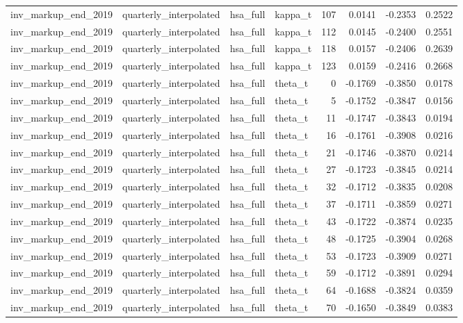 \begin{tabular}{llllrrrr}
inv\_markup\_end\_2019 & quarterly\_interpolated & hsa\_full & kappa\_t & 107 & 0.0141 & -0.2353 & 0.2522 \\
inv\_markup\_end\_2019 & quarterly\_interpolated & hsa\_full & kappa\_t & 112 & 0.0145 & -0.2400 & 0.2551 \\
inv\_markup\_end\_2019 & quarterly\_interpolated & hsa\_full & kappa\_t & 118 & 0.0157 & -0.2406 & 0.2639 \\
inv\_markup\_end\_2019 & quarterly\_interpolated & hsa\_full & kappa\_t & 123 & 0.0159 & -0.2416 & 0.2668 \\
inv\_markup\_end\_2019 & quarterly\_interpolated & hsa\_full & theta\_t & 0 & -0.1769 & -0.3850 & 0.0178 \\
inv\_markup\_end\_2019 & quarterly\_interpolated & hsa\_full & theta\_t & 5 & -0.1752 & -0.3847 & 0.0156 \\
inv\_markup\_end\_2019 & quarterly\_interpolated & hsa\_full & theta\_t & 11 & -0.1747 & -0.3843 & 0.0194 \\
inv\_markup\_end\_2019 & quarterly\_interpolated & hsa\_full & theta\_t & 16 & -0.1761 & -0.3908 & 0.0216 \\
inv\_markup\_end\_2019 & quarterly\_interpolated & hsa\_full & theta\_t & 21 & -0.1746 & -0.3870 & 0.0214 \\
inv\_markup\_end\_2019 & quarterly\_interpolated & hsa\_full & theta\_t & 27 & -0.1723 & -0.3845 & 0.0214 \\
inv\_markup\_end\_2019 & quarterly\_interpolated & hsa\_full & theta\_t & 32 & -0.1712 & -0.3835 & 0.0208 \\
inv\_markup\_end\_2019 & quarterly\_interpolated & hsa\_full & theta\_t & 37 & -0.1711 & -0.3859 & 0.0271 \\
inv\_markup\_end\_2019 & quarterly\_interpolated & hsa\_full & theta\_t & 43 & -0.1722 & -0.3874 & 0.0235 \\
inv\_markup\_end\_2019 & quarterly\_interpolated & hsa\_full & theta\_t & 48 & -0.1725 & -0.3904 & 0.0268 \\
inv\_markup\_end\_2019 & quarterly\_interpolated & hsa\_full & theta\_t & 53 & -0.1723 & -0.3909 & 0.0271 \\
inv\_markup\_end\_2019 & quarterly\_interpolated & hsa\_full & theta\_t & 59 & -0.1712 & -0.3891 & 0.0294 \\
inv\_markup\_end\_2019 & quarterly\_interpolated & hsa\_full & theta\_t & 64 & -0.1688 & -0.3824 & 0.0359 \\
inv\_markup\_end\_2019 & quarterly\_interpolated & hsa\_full & theta\_t & 70 & -0.1650 & -0.3849 & 0.0383 \\

\end{tabular}
